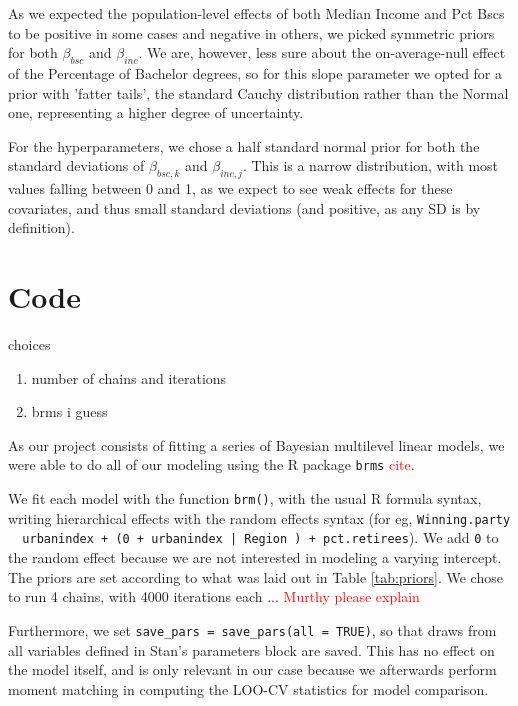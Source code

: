 \documentclass[12pt]{article}
\newcommand{\red}[1]{\textcolor{red}{#1}}
\begin{document}
 

As we expected the population-level effects of both Median Income and Pct Bscs to be positive in some cases and negative in others, we picked symmetric priors for both $\beta_{bsc}$ and $\beta_{inc}$. We are, however, less sure about the on-average-null effect of the Percentage of Bachelor degrees, so for this slope parameter we opted for a prior with 'fatter tails', the standard Cauchy distribution rather than the Normal one, representing a higher degree of uncertainty.


For the hyperparameters, we chose a half standard normal prior for both the standard deviations of $\beta_{bsc,k}$ and $\beta_{inc,j}$. This is a narrow distribution, with most values falling between 0 and 1, as we expect to see weak effects for these covariates, and thus small standard deviations (and positive, as any SD is by definition).









\section{Code}

choices
\begin{enumerate}
	\item number of chains and iterations
	\item brms i guess
\end{enumerate}


As our project consists of fitting a series of Bayesian multilevel linear models, we were able to do all of our modeling using the R package \verb|brms| \red{cite}.


We fit each model with the function \verb|brm()|, with the usual R formula syntax, writing hierarchical effects with the random effects syntax (for eg, \texttt{Winning.party ~ urbanindex + (0 + urbanindex | Region ) + pct.retirees}). We add \verb|0| to the random effect because we are not interested in modeling a varying intercept.
The priors are set according to what was laid out in Table \ref{tab:priors}.
We chose to run 4 chains, with 4000 iterations each ... \red{Murthy please explain}

Furthermore, we set \texttt{save\_pars = save\_pars(all = TRUE)}, so that draws from all variables defined in Stan's parameters block are saved. This has no effect on the model itself, and is only relevant in our case because we afterwards perform moment matching in computing the LOO-CV statistics for model comparison.
\end{document}
